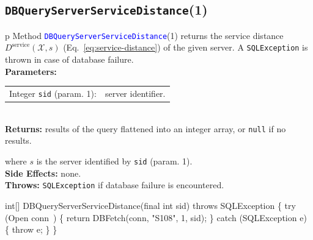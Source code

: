 \subsection{\texttt{DBQueryServerServiceDistance}(1)}
\begin{tabular}{p{\textwidth}}
\toprule
{}
Method \textcolor{blue}{{\tt{}\protect{}DBQueryServerServiceDistance}}(1) returns the
service distance $D^\textrm{service}(\mathcal{X},s)$
(Eq.~\ref{eq:service-distance}) of the given server.
A {\tt{}SQLException} is thrown in case of database failure.\\
\midrule
\textbf{Parameters:}\\
\begin{tabular}{lp{116mm}}
Integer {\tt{}sid} (param. 1):&server identifier.
\end{tabular}\\
\textbf{Returns:} results of the query flattened into an integer array,
or {\tt{}null} if no results.


where $s$ is the server identified by {\tt{}sid} (param. 1).\\
\textbf{Side Effects:} none.\\
\textbf{Throws:} {\tt{}SQLException} if database failure is encountered.\\
\bottomrule
\end{tabular}
\nwenddocs{}\endmoddef{}
int[] DBQueryServerServiceDistance(final int sid) throws SQLException \{
  try (\LA{}Open \code{}conn\edoc{}~{\nwtagstyle{}}\RA{}) \{
    return DBFetch(conn, "S108", 1, sid);
  \} catch (SQLException e) \{
    throw e;
  \}
\}
\eatline
{}\nwendcode{}\nwdocspar
